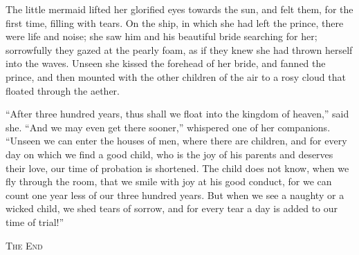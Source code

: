 The little mermaid lifted her glorified eyes towards the sun, and felt them, for the first time, filling with tears.
On the ship, in which she had left the prince, there were life and noise; she saw him and his beautiful bride searching for her; sorrowfully they gazed at the pearly foam, as if they knew she had thrown herself into the waves.
Unseen she kissed the forehead of her bride, and fanned the prince, and then mounted with the other children of the air to a rosy cloud that floated through the aether.

``After three hundred years, thus shall we float into the kingdom of heaven,'' said she.
``And we may even get there sooner,'' whispered one of her companions.
``Unseen we can enter the houses of men, where there are children, and for every day on which we find a good child, who is the joy of his parents and deserves their love, our time of probation is shortened.
The child does not know, when we fly through the room, that we smile with joy at his good conduct, for we can count one year less of our three hundred years.
But when we see a naughty or a wicked child, we shed tears of sorrow, and for every tear a day is added to our time of trial!'' 

\begin{center}
    \textsc{The End}
\end{center}